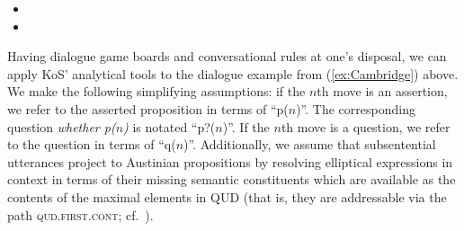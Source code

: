 \documentclass[output=paper,biblatex,babelshorthands,newtxmath,draftmode,colorlinks,citecolor=brown]{langscibook}
\begin{document}
\begin{itemize}
\begin{itemize}
\item
{}
\item
{}
\end{itemize}
\end{itemize}


Having dialogue game boards and conversational rules at one's disposal, we can apply KoS' analytical tools to the dialogue example from (\ref{ex:Cambridge}) above.
%
We make the following simplifying assumptions: if the $n$th move is an assertion, we refer to the asserted proposition in terms of \enquote{p($n$)}. %
The corresponding question \textit{whether p($n$)} is notated \enquote{p?($n$)}.
%
If the $n$th move is a question, we refer to the question in terms of \enquote{q($n$)}.
%
Additionally, we assume that subsentential utterances project to Austinian propositions by resolving elliptical expressions in context in terms of their missing semantic constituents which are available as the contents of the maximal elements in QUD (that is, they are addressable via the path \textsc{qud.first.cont}; cf.\  \citealt[]{Ginzburg:2012}). 
\end{document}
